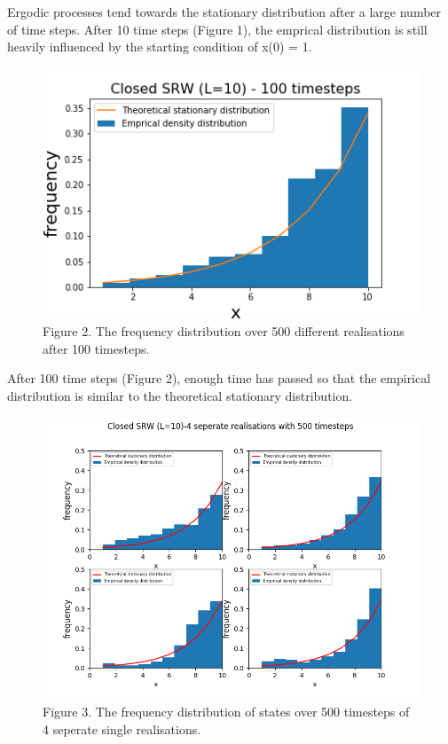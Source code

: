 \documentclass{article}
\begin{document}
Ergodic processes tend towards the stationary distribution after a large number of time steps. After 10 time steps (Figure 1), the emprical distribution is still heavily influenced by the starting condition of x(0) = 1. 

\begin{figure}[H]
\includegraphics[scale=1]{100_steps_a.png} 
\small{Figure 2. The frequency distribution over 500 different realisations after 100 timesteps.}
\end{figure}

After 100 time steps (Figure 2), enough time has passed so that the empirical distribution is similar to the theoretical stationary distribution.


\begin{figure}[H]
\includegraphics[scale=0.7]{500_steps_b.png} 
\small{Figure 3. The frequency distribution of states over 500 timesteps of 4 seperate single realisations. }
\end{figure}
\end{document}
